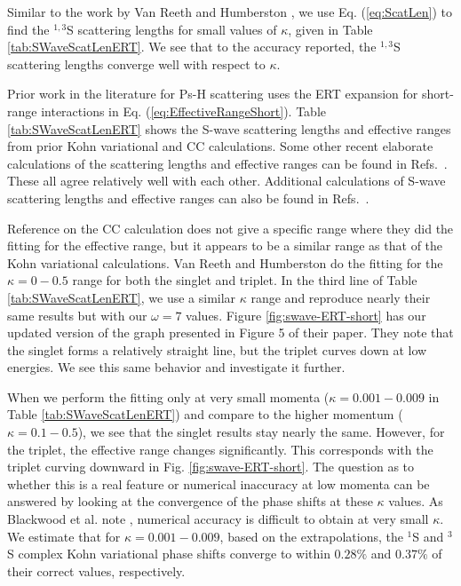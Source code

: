 \documentclass[preprint,showpacs,preprintnumbers,amsmath,amssymb,longbibliography,pra,aps]{revtex4-1}
\begin{document}
Similar to the work by Van Reeth and Humberston \cite{VanReeth2003}, we use Eq. (\ref{eq:ScatLen}) to find the $^{1,3}$S scattering lengths for small values of $\kappa$, given in Table \ref{tab:SWaveScatLenERT}. We see that to the accuracy reported, the $^{1,3}$S scattering lengths converge well with respect to $\kappa$.

Prior work in the literature for Ps-H scattering \cite{Blackwood2002,Ivanov2002,Walters2004,VanReeth2003} uses the ERT expansion for short-range interactions in Eq. (\ref{eq:EffectiveRangeShort}). Table \ref{tab:SWaveScatLenERT} shows the S-wave scattering lengths and effective ranges from prior Kohn variational \cite{VanReeth2003} and CC \cite{Blackwood2002,Walters2004} calculations. Some other recent elaborate calculations of the scattering lengths and effective ranges can be found in Refs.~\cite{Sinha2000,Ivanov2001,Chiesa2002,Ivanov2002}. These all agree relatively well with each other. Additional calculations of S-wave scattering lengths and effective ranges can also be found in Refs.~\cite{Hara1975,Page1976,Drachman1975,Drachman1976,Campbell1998,Adhikari1999,Adhikari2001b}.

Reference \cite{Blackwood2002} on the CC calculation does not give a specific range where they did the fitting for the effective range, but it appears to be a similar range as that of the Kohn variational calculations. Van Reeth and Humberston \cite{VanReeth2003} do the fitting for the $\kappa = 0-0.5$ range for both the singlet and triplet. In the third line of Table \ref{tab:SWaveScatLenERT}, we use a similar $\kappa$ range and reproduce nearly their same results but with our $\omega = 7$ values. Figure \ref{fig:swave-ERT-short} has our updated version of the graph presented in Figure 5 of their paper. They note that the singlet forms a relatively straight line, but the triplet curves down at low energies. We see this same behavior and investigate it further.

When we perform the fitting only at very small momenta ($\kappa = 0.001 - 0.009$ in Table \ref{tab:SWaveScatLenERT}) and compare to the higher momentum ($\kappa = 0.1 - 0.5$), we see that the singlet results stay nearly the same. However, for the triplet, the effective range changes significantly. This corresponds with the triplet curving downward in Fig. \ref{fig:swave-ERT-short}. The question as to whether this is a real feature or numerical inaccuracy at low momenta can be answered by looking at the convergence of the phase shifts at these $\kappa$ values. As Blackwood et al. note \cite{Blackwood2002}, numerical accuracy is difficult to obtain at very small $\kappa$. We estimate that for $\kappa = 0.001 - 0.009$, based on the extrapolations, the $^1$S and $^3$S complex Kohn variational phase shifts converge to within $0.28\%$ and $0.37\%$ of their correct values, respectively.
\end{document}
